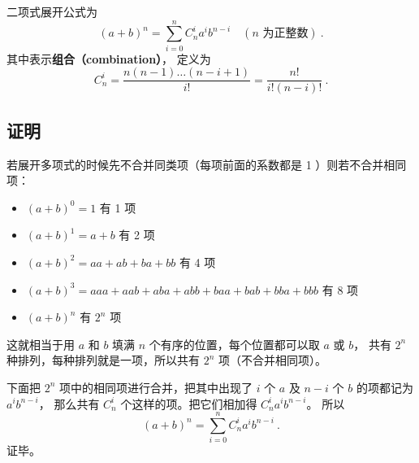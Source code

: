 

二项式展开公式为
\begin{equation}\label{eq_BiNor_1}
(a + b)^n = \sum_{i = 0}^n C_n^i a^i b^{n - i} \quad (n \text{ 为正整数})~.
\end{equation}
其中表示\textbf{组合（combination）}， 定义为
\begin{equation}
C_n^i = \frac{n(n - 1)\dots (n - i + 1)}{i!} = \frac{n!}{i!(n - i)!}~.
\end{equation}

\subsection{证明}\label{sub_BiNor_5}
若展开多项式的时候先不合并同类项（每项前面的系数都是 1 ）则若不合并相同项：
\begin{itemize}
\item $(a + b)^0 = 1$ 有 1 项
\item $(a + b)^1 = a + b$ 有 2 项
\item $(a + b)^2 = aa + ab + ba + bb$ 有 4 项
\item $(a + b)^3 = aaa + aab + aba + abb + baa + bab + bba + bbb$ 有 8 项
\item $(a + b)^n$ 有 $2^n$ 项
\end{itemize}

这就相当于用 $a$ 和 $b$ 填满 $n$ 个有序的位置，每个位置都可以取 $a$ 或 $b$， 共有 $2^n$ 种排列，每种排列就是一项，所以共有 $2^n$ 项（不合并相同项）。

下面把 $2^n$ 项中的相同项进行合并，把其中出现了 $i$ 个 $a$ 及 $n-i$ 个 $b$ 的项都记为 $a^i b^{n-i}$， 那么共有 $C_n^i$ 个这样的项。把它们相加得 $C_n^i a^i b^{n-i}$。 所以
\begin{equation}
(a + b)^n = \sum_{i = 0}^n  C_n^i a^i b^{n - i}~.
\end{equation}
证毕。
